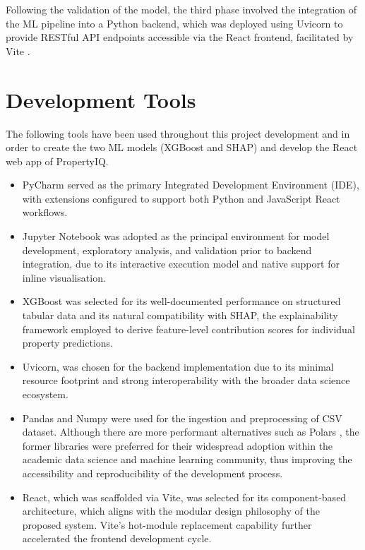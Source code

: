 Following the validation of the model, the third phase involved the integration of the ML pipeline into a Python backend, which was deployed using Uvicorn to provide RESTful API endpoints accessible via the React frontend, facilitated by Vite \parencite{VoidZeroInc2026}.


\section{Development Tools}

The following tools have been used throughout this project development and in order to create the two ML models (XGBoost and SHAP) and  develop the React web app of PropertyIQ.

\begin{itemize}
    \item PyCharm \parencite{JetBrains2026} served as the primary Integrated Development Environment (IDE), with extensions configured to support both Python and JavaScript React workflows.
    
    \item Jupyter Notebook \parencite{JupyterTeam2015} was adopted as the principal environment for model development, exploratory analysis, and validation prior to backend integration, due to its interactive execution model and native support for inline visualisation.
    
    \item XGBoost was selected for its well-documented performance on structured tabular data and its natural compatibility with SHAP, the explainability framework employed to derive feature-level contribution scores for individual property predictions.
    
    \item Uvicorn, was chosen for the backend implementation due to its minimal resource footprint and strong interoperability with the broader data science ecosystem.
    
    \item Pandas and Numpy were used for the ingestion and preprocessing of CSV dataset. Although there are more performant alternatives such as Polars \parencite{JodieBurchell2024}, the former libraries were preferred for their widespread adoption within the academic data science and machine learning community, thus improving the accessibility and reproducibility of the development process.
    
    \item React, which was scaffolded via Vite, was selected for its component-based architecture, which aligns with the modular design philosophy of the proposed system. Vite's hot-module replacement capability further accelerated the frontend development cycle.
    

\end{itemize}
